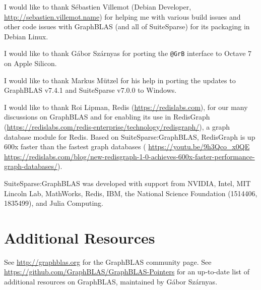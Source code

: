 \documentclass[12pt]{article}
\begin{document}
I would like to thank S\'ebastien Villemot (Debian Developer,
\url{http://sebastien.villemot.name}) for helping me with various build issues
and other code issues with GraphBLAS (and all of SuiteSparse) for its packaging
in Debian Linux.

I would like to thank G{\'{a}}bor Sz{\'{a}}rnyas for porting the \verb'@GrB'
interface to Octave 7 on Apple Silicon.

I would like to thank Markus M\"{u}tzel
for his help in porting the updates
to GraphBLAS v7.4.1 and SuiteSparse v7.0.0 to Windows.

I would like to thank Roi Lipman, Redis (\url{https://redislabs.com}), for
our many discussions on GraphBLAS and for enabling its use in RedisGraph
(\url{https://redislabs.com/redis-enterprise/technology/redisgraph/}), a graph
database module for Redis.  Based on SuiteSparse:GraphBLAS, RedisGraph is up
600x faster than the fastest graph databases ({\footnotesize
\url{https://youtu.be/9h3Qco_x0QE} \newline
\url{https://redislabs.com/blog/new-redisgraph-1-0-achieves-600x-faster-performance-graph-databases/}}).

SuiteSparse:GraphBLAS was developed with support from
NVIDIA, Intel, MIT Lincoln Lab, MathWorks, Redis, IBM,
the National Science Foundation (1514406, 1835499), and Julia Computing.

\section{Additional Resources}

See \url{http://graphblas.org} for the GraphBLAS community page.  See
\url{https://github.com/GraphBLAS/GraphBLAS-Pointers} for an up-to-date list of
additional resources on GraphBLAS, maintained by G{\'{a}}bor Sz{\'{a}}rnyas.

{\footnotesize
{}


}
\end{document}

